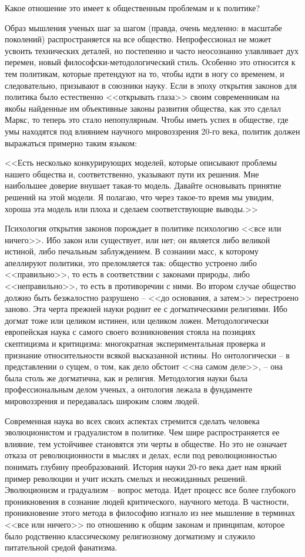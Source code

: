 \documentclass{book}
\begin{document}
Какое отношение это имеет к общественным проблемам и к политике?

Образ мышления ученых шаг за шагом (правда, очень мед­ленно: в масштабе поколений) распространяется на все общест­во. Непрофессионал не может усвоить технических деталей, но постепенно и часто неосознанно улавливает дух перемен, новый философски-методологический стиль. Особенно это относится к тем политикам, которые претендуют на то, чтобы идти в ногу со временем, и следовательно, призывают в союзники науку. Если в эпоху открытия законов для политика было естественно <<открывать глаза>> своим современникам на якобы найден­ные им объективные законы развития общества, как это сделал Маркс, то теперь это стало непопулярным. Чтобы иметь успех в обществе, где умы находятся под влиянием научного мировоззрения 20-го века, политик должен выражаться примерно таким языком:

<<Есть несколько конкурирующих моделей, которые описы­вают проблемы нашего общества и, соответственно, указывают пути их решения. Мне наибольшее доверие внушает такая-то модель. Давайте основывать принятие решений на этой модели. Я полагаю, что через такое-то время мы увидим, хороша эта модель или плоха и сделаем соответствующие выводы.>>

Психология открытия законов порождает в политике психологию <<все или ничего>>. Ибо закон или существует, или нет; он является либо великой истиной, либо печальным заблуждением. В сознании масс, к которому апеллируют политики, это преломляется так: общество устроено либо <<правильно>>, то есть в соответствии с законами природы, либо <<неправильно>>, то есть в противоречии с ними. Во втором случае общество должно быть безжалостно разрушено -- <<до основания, а затем>> перестроено заново. Эта черта прежней науки роднит ее с догматическими религиями. Ибо догмат тоже или целиком истинен, или целиком ложен. Методологически европейская наука с самого своего возникновения стояла на позициях скептицизма и критицизма: многократная экспериментальная проверка и признание относительности всякой высказанной истины. Но онтологически -- в представлении о сущем, о том, как дело обстоит <<на самом деле>>, -- она была столь же догматична, как и религия. Методология науки была профессиональным делом ученых, а онтология лежала 
в 
фундаменте мировоззрения и пе­редавалась широким слоям людей.

Современная наука во всех своих аспектах стремится сделать человека эволюционистом и градуалистом в политике. Чем шире распространяется ее влияние, тем устойчивее становятся эти черты в обществе. Но это не означает отказа от революционности в мыслях и делах, если под революционностью понимать глубину преобразований. История науки 20-го века дает нам яркий пример революции и учит искать смелых и неожиданных решений. Эволюционизм и градуализм -- вопрос метода. Идет процесс все более глубокого проникновения в сознание людей критического, научного метода. В частности, проникновение этого метода в философию изгнало из нее мышление в терминах <<все или ничего>> по отношению к общим законам и принципам, которое было родственно классическому религиозному догматизму и служило питательной средой фанатизма.
\end{document}
